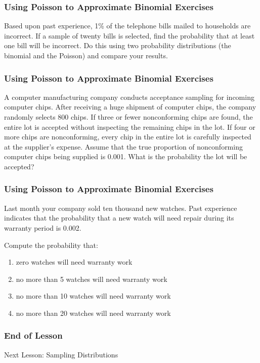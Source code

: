 \documentclass[xcolor=dvipsnames]{beamer}
\begin{document}
\begin{frame}
  \frametitle{Using Poisson to Approximate Binomial Exercises}
  {\ubung} Based upon past experience, 1\% of the telephone bills
  mailed to households are incorrect. If a sample of twenty bills is
  selected, find the probability that at least one bill will be
  incorrect. Do this using two probability distributions (the binomial
  and the Poisson) and compare your results.
\end{frame}

\begin{frame}
  \frametitle{Using Poisson to Approximate Binomial Exercises}
  {\ubung} A computer manufacturing company conducts acceptance
  sampling for incoming computer chips. After receiving a huge
  shipment of computer chips, the company randomly selects 800 chips.
  If three or fewer nonconforming chips are found, the entire lot is
  accepted without inspecting the remaining chips in the lot. If four
  or more chips are nonconforming, every chip in the entire lot is
  carefully inspected at the supplier's expense. Assume that the true
  proportion of nonconforming computer chips being supplied is 0.001.
  What is the probability the lot will be accepted?
\end{frame}

\begin{frame}
  \frametitle{Using Poisson to Approximate Binomial Exercises}
  {\ubung} Last month your company sold ten thousand new watches. Past
experience indicates that the probability that a new watch
will  need  repair  during  its  warranty  period  is  0.002.

Compute the probability that:
\begin{enumerate}
\item zero watches will need warranty work
\item no more than 5 watches will need warranty work
\item no more than 10 watches will need warranty work
\item no more than 20 watches will need warranty work
\end{enumerate}
\end{frame}

\begin{frame}
  \frametitle{End of Lesson}
Next Lesson: Sampling Distributions
\end{frame}
\end{document}
